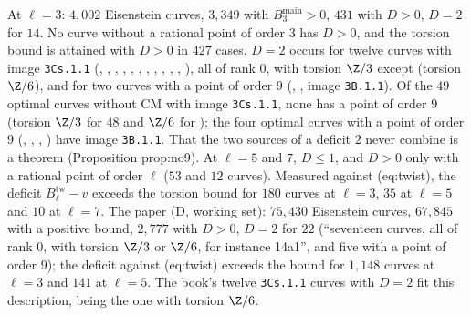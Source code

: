 \begin{sloppypar}
\begin{example}\label{ex:computation:repro-eis}
At $\ell=3$: $4{,}002$ Eisenstein curves, $3{,}349$ with $B^{\mathrm{main}}_3>0$, $431$ with $D>0$, $D=2$ for $14$. No curve without a rational point of order $3$ has $D>0$, and
the torsion bound is attained with $D>0$ in $427$ cases. $D=2$ occurs for twelve curves with image \texttt{3Cs.1.1} (, , ,
, , , , , , , , ), all of rank $0$, with torsion $\Z/3$
except  (torsion $\Z/6$), and for two curves with a point of order $9$ (, , image \texttt{3B.1.1}). Of the $49$ optimal curves
without CM with image \texttt{3Cs.1.1}, none has a point of order $9$ (torsion $\Z/3$ for $48$ and $\Z/6$ for ); the four optimal curves with a point of
order $9$ (, , , ) have image \texttt{3B.1.1}. That the two sources of a deficit $2$ never combine is a theorem
(Proposition prop:no9). At $\ell=5$ and $7$, $D\le1$, and $D>0$ only with a rational point of order $\ell$ ($53$ and $12$ curves). Measured against (eq:twist), the
deficit $B^{\mathrm{tw}}_\ell-v$ exceeds the torsion bound for $180$ curves at $\ell=3$, $35$ at $\ell=5$ and $10$ at $\ell=7$. The paper (D, working set): $75{,}430$
Eisenstein curves, $67{,}845$ with a positive bound, $2{,}777$ with $D>0$, $D=2$ for $22$ (``seventeen curves, all of rank $0$, with torsion $\Z/3$ or $\Z/6$, for
instance 14a1'', and five with a point of order $9$); the deficit against (eq:twist) exceeds the bound for $1{,}148$ curves at $\ell=3$ and $141$ at $\ell=5$. The
book's twelve \texttt{3Cs.1.1} curves with $D=2$ fit this description,  being the one with torsion $\Z/6$.
\end{example}


\end{sloppypar}
